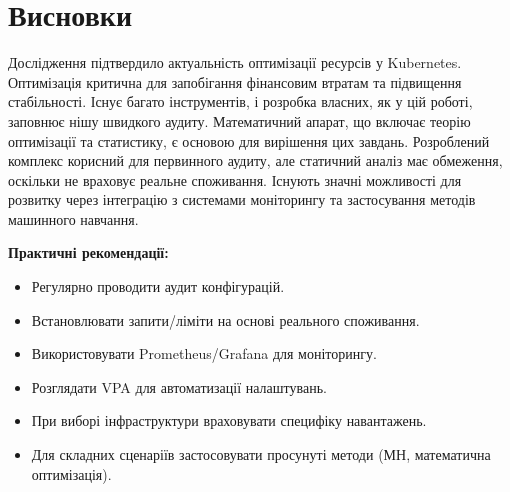 \chapter*{Висновки}

Дослідження підтвердило актуальність оптимізації ресурсів у Kubernetes.  Оптимізація критична для запобігання фінансовим втратам та підвищення стабільності.  Існує багато інструментів, і розробка власних, як у цій роботі, заповнює нішу швидкого аудиту.  Математичний апарат, що включає теорію оптимізації та статистику, є основою для вирішення цих завдань.  Розроблений комплекс корисний для первинного аудиту, але статичний аналіз має обмеження, оскільки не враховує реальне споживання.  Існують значні можливості для розвитку через інтеграцію з системами моніторингу та застосування методів машинного навчання. 

\textbf{Практичні рекомендації:}
\begin{itemize}
	\item Регулярно проводити аудит конфігурацій. 
	\item Встановлювати запити/ліміти на основі реального споживання. 
	\item Використовувати Prometheus/Grafana для моніторингу. 
	\item Розглядати VPA для автоматизації налаштувань. 
	\item При виборі інфраструктури враховувати специфіку навантажень. 
	\item Для складних сценаріїв застосовувати просунуті методи (МН, математична оптимізація). 
\end{itemize}

\appendix
